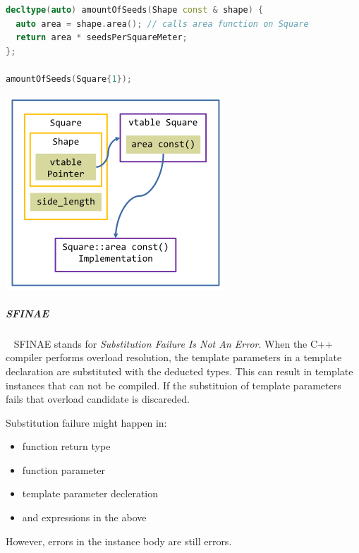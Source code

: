 \documentclass[11pt,twoside,landscape]{article}
\begin{document}
\begin{multicols}{2}
\begin{lstlisting}[language=c++,numbers=none]
decltype(auto) amountOfSeeds(Shape const & shape) {
  auto area = shape.area(); // calls area function on Square
  return area * seedsPerSquareMeter;
};

amountOfSeeds(Square{1});
\end{lstlisting}


{
\begin{center}
\includegraphics[width=.9\linewidth]{img/dynamic_dispatch.png}
\end{center}
\label{fig:dynamic-dispatch}
}
\subparagraph{SFINAE} \
\label{sec:org589fed6}
SFINAE stands for \emph{Substitution Failure Is Not An Error}.
When the C++ compiler performs overload resolution, the template parameters in a template declaration are substituted with the deducted types.
This can result in template instances that can not be compiled.
If the substituion of template parameters fails that overload candidate is discareded.

Substitution failure might happen in:
\begin{itemize}
\item function return type
\item function parameter
\item template parameter decleration
\item and expressions in the above
\end{itemize}


However, errors in the instance body are still errors.



\end{multicols}
\end{document}
